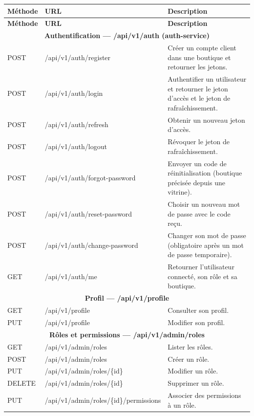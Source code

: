 \renewcommand{\arraystretch}{1.15}
\setlength{\tabcolsep}{4pt}
\begin{longtable}{|p{1.8cm}|p{6.8cm}|p{6.2cm}|}
\hline
\textbf{Méthode} & \textbf{URL} & \textbf{Description} \\
\hline
\endfirsthead
\hline
\textbf{Méthode} & \textbf{URL} & \textbf{Description} \\
\hline
\endhead
\multicolumn{3}{|c|}{\textbf{Authentification --- /api/v1/auth (auth-service)}} \\
\hline
POST & /api/v1/auth/register & Créer un compte client dans une boutique et retourner les jetons. \\
\hline
POST & /api/v1/auth/login & Authentifier un utilisateur et retourner le jeton d'accès et le jeton de rafraîchissement. \\
\hline
POST & /api/v1/auth/refresh & Obtenir un nouveau jeton d'accès. \\
\hline
POST & /api/v1/auth/logout & Révoquer le jeton de rafraîchissement. \\
\hline
POST & /api/v1/auth/forgot-password & Envoyer un code de réinitialisation (boutique précisée depuis une vitrine). \\
\hline
POST & /api/v1/auth/reset-password & Choisir un nouveau mot de passe avec le code reçu. \\
\hline
POST & /api/v1/auth/change-password & Changer son mot de passe (obligatoire après un mot de passe temporaire). \\
\hline
GET & /api/v1/auth/me & Retourner l'utilisateur connecté, son rôle et sa boutique. \\
\hline
\multicolumn{3}{|c|}{\textbf{Profil --- /api/v1/profile}} \\
\hline
GET & /api/v1/profile & Consulter son profil. \\
\hline
PUT & /api/v1/profile & Modifier son profil. \\
\hline
\multicolumn{3}{|c|}{\textbf{Rôles et permissions --- /api/v1/admin/roles}} \\
\hline
GET & /api/v1/admin/roles & Lister les rôles. \\
\hline
POST & /api/v1/admin/roles & Créer un rôle. \\
\hline
PUT & /api/v1/admin/roles/\{id\} & Modifier un rôle. \\
\hline
DELETE & /api/v1/admin/roles/\{id\} & Supprimer un rôle. \\
\hline
PUT & /api/v1/admin/roles/\{id\}/permissions & Associer des permissions à un rôle. \\

\end{longtable}
